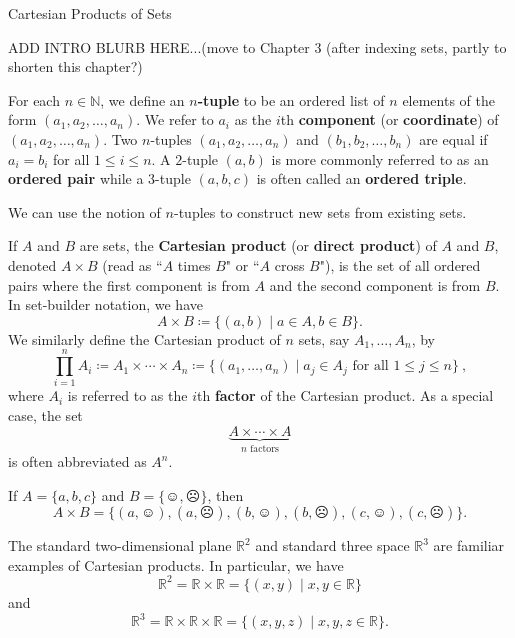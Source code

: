 \begin{section}{Cartesian Products of Sets}\label{sec:Cartesian Products}

ADD INTRO BLURB HERE...(move to Chapter 3 (after indexing sets, partly to shorten this chapter?)

\begin{definition}
For each $n\in \mathbb{N}$, we define an \textbf{$n$-tuple} to be an ordered list of $n$ elements of the form $(a_1, a_2,\ldots,a_n)$. We refer to $a_i$ as the $i$th \textbf{component} (or \textbf{coordinate}) of $(a_1, a_2,\ldots,a_n)$. Two $n$-tuples $(a_1, a_2,\ldots,a_n)$ and $(b_1, b_2,\ldots,b_n)$ are equal if $a_i=b_i$ for all $1\leq i\leq n$. A $2$-tuple $(a,b)$ is more commonly referred to as an \textbf{ordered pair} while a $3$-tuple $(a,b,c)$ is often called an \textbf{ordered triple}.
\end{definition}

We can use the notion of $n$-tuples to construct new sets from existing sets.

\begin{definition}
If $A$ and $B$ are sets, the \textbf{Cartesian product} (or \textbf{direct product}) of $A$ and $B$, denoted $A\times B$ (read as ``$A$ times $B$" or ``$A$ cross $B$"), is the set of all ordered pairs where the first component is from $A$ and the second component is from $B$. In set-builder notation, we have
\[
\boxed{A\times B\coloneqq \{(a,b)\mid a\in A, b\in B\}}.
\]
We similarly define the Cartesian product of $n$ sets, say $A_1, \ldots, A_n$, by
\[
\boxed{\prod_{i=1}^{n} A_i\coloneqq A_1\times \cdots \times A_n\coloneqq \{(a_1,\ldots,a_n)\mid  a_j\in A_j \mbox{ for all }1\leq j\leq n\}}\ ,
\]
where $A_i$ is referred to as the $i$th \textbf{factor} of the Cartesian product. As a special case, the set 
\[
\underbrace{A\times \cdots \times A}_{n\text{ factors}}
\]
is often abbreviated as $A^n$.
\end{definition}

\begin{example}\label{ex:CartesianProduct}
If $A=\{a,b,c\}$ and $B=\{\smiley,\frownie\}$, then 
\[
A\times B=\{(a,\smiley), (a,\frownie),(b,\smiley),(b,\frownie), (c,\smiley),(c,\frownie)\}.
\]
\end{example}

\begin{example}
The standard two-dimensional plane $\mathbb{R}^2$ and standard three space $\mathbb{R}^{3}$ are familiar examples of Cartesian products.  In particular, we have
\[
\mathbb{R}^2=\mathbb{R}\times \mathbb{R}=\{(x,y)\mid x,y\in \mathbb{R}\}
\]
and
\[
\mathbb{R}^3=\mathbb{R}\times \mathbb{R}\times \mathbb{R}=\{(x,y,z)\mid x,y,z\in \mathbb{R}\}.
\]
\end{example}


\end{section}
